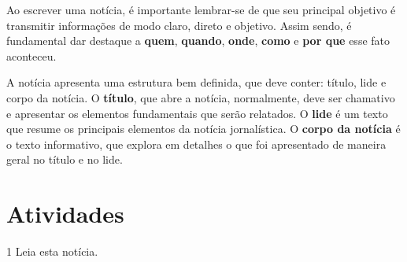{Ao escrever uma notícia, é importante lembrar-se de que seu principal
objetivo é transmitir informações de modo claro, direto e objetivo. Assim sendo,
é fundamental dar destaque a \textbf{quem}, \textbf{quando},
\textbf{onde}, \textbf{como} e \textbf{por que} esse fato aconteceu.

A notícia apresenta uma estrutura bem definida, que deve conter: título,
lide e corpo da notícia. O \textbf{título}, que abre a notícia, normalmente,
deve ser chamativo e apresentar os elementos fundamentais que serão relatados.
O \textbf{lide} é um texto que resume os principais elementos da notícia jornalística. 
O \textbf{corpo da notícia} é o texto informativo, 
que explora em detalhes o que foi apresentado de maneira geral no título e no lide. 
}

\section*{Atividades}

\num{1} Leia esta notícia.



